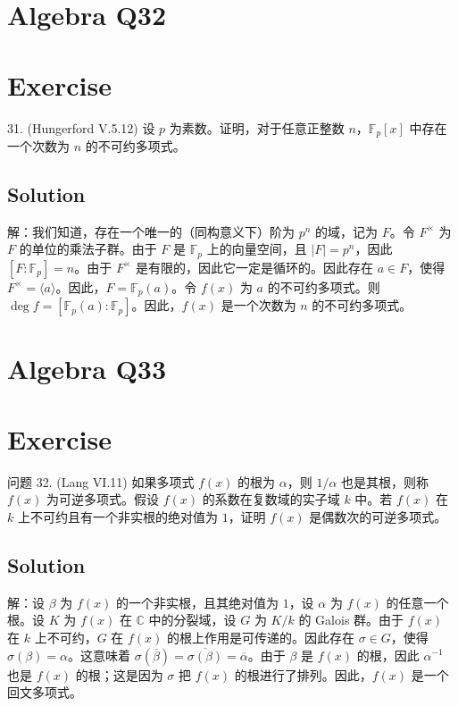 \documentclass[12pt]{book}
\begin{document}
\section{Algebra Q32}
\section*{Exercise}
31. (Hungerford V.5.12) 设 $p$ 为素数。证明，对于任意正整数 $n$，$\mathbb{F}_p[x]$ 中存在一个次数为 $n$ 的不可约多项式。



\subsection*{Solution}
解：我们知道，存在一个唯一的（同构意义下）阶为 $p^n$ 的域，记为 $F$。令 $F^\times$ 为 $F$ 的单位的乘法子群。由于 $F$ 是 $\mathbb{F}_p$ 上的向量空间，且 $|F| = p^n$，因此 $[F : \mathbb{F}_p] = n$。由于 $F^\times$ 是有限的，因此它一定是循环的。因此存在 $a \in F$，使得 $F^\times = \langle a \rangle$。因此，$F = \mathbb{F}_p(a)$。令 $f(x)$ 为 $a$ 的不可约多项式。则 $\deg f = [\mathbb{F}_p(a) : \mathbb{F}_p]$。因此，$f(x)$ 是一个次数为 $n$ 的不可约多项式。
\newpage
\section{Algebra Q33}
\section*{Exercise}
问题 32. (Lang VI.11) 如果多项式 $f(x)$ 的根为 $\alpha$，则 $1/\alpha$ 也是其根，则称 $f(x)$ 为可逆多项式。假设 $f(x)$ 的系数在复数域的实子域 $k$ 中。若 $f(x)$ 在 $k$ 上不可约且有一个非实根的绝对值为 $1$，证明 $f(x)$ 是偶数次的可逆多项式。



\subsection*{Solution}
解：设 $\beta$ 为 $f(x)$ 的一个非实根，且其绝对值为 $1$，设 $\alpha$ 为 $f(x)$ 的任意一个根。设 $K$ 为 $f(x)$ 在 $\mathbb{C}$ 中的分裂域，设 $G$ 为 $K/k$ 的 Galois 群。由于 $f(x)$ 在 $k$ 上不可约，$G$ 在 $f(x)$ 的根上作用是可传递的。因此存在 $\sigma \in G$，使得 $\sigma(\beta) = \alpha$。这意味着 $\sigma(\overline{\beta}) = \overline{\sigma(\beta)} = \overline{\alpha}$。由于 $\beta$ 是 $f(x)$ 的根，因此 $\alpha^{-1}$ 也是 $f(x)$ 的根；这是因为 $\sigma$ 把 $f(x)$ 的根进行了排列。因此，$f(x)$ 是一个回文多项式。
\end{document}
